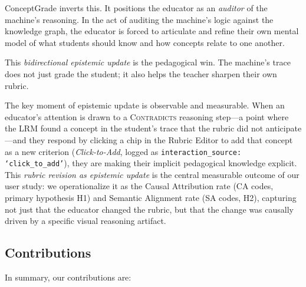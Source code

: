 \documentclass[journal,review]{vgtc}
\begin{document}
ConceptGrade inverts this. It positions the educator as an \textit{auditor} of the machine's reasoning. In the act of auditing the machine's logic against the knowledge graph, the educator is forced to articulate and refine their own mental model of what students should know and how concepts relate to one another. 

This \textit{bidirectional epistemic update} is the pedagogical win. The machine's trace does not just grade the student; it also helps the teacher sharpen their own rubric.

The key moment of epistemic update is observable and measurable. When an educator's attention is drawn to a \textsc{Contradicts} reasoning step---a point where the LRM found a concept in the student's trace that the rubric did not anticipate---and they respond by clicking a chip in the Rubric Editor to add that concept as a new criterion (\textit{Click-to-Add}, logged as \texttt{interaction\_source: `click\_to\_add'}), they are making their implicit pedagogical knowledge explicit. This \textit{rubric revision as epistemic update} is the central measurable outcome of our user study: we operationalize it as the Causal Attribution rate (CA codes, primary hypothesis H1) and Semantic Alignment rate (SA codes, H2), capturing not just that the educator changed the rubric, but that the change was causally driven by a specific visual reasoning artifact.

\subsection{Contributions}

In summary, our contributions are:
\end{document}
